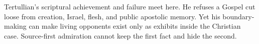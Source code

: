Tertullian's scriptural achievement and failure meet here. He refuses a Gospel
cut loose from creation, Israel, flesh, and public apostolic memory. Yet his
boundary-making can make living opponents exist only as exhibits inside the
Christian case. Source-first admiration cannot keep the first fact and hide the
second.
